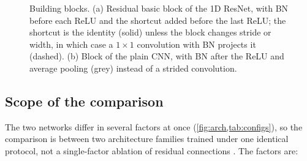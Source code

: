 \documentclass[journal,onecolumn]{IEEEtran}
\begin{document}
\begin{figure}[!t]
  \caption{Building blocks. (a) Residual basic block of the 1D ResNet, with
  BN before each ReLU and the shortcut added before the last ReLU; the
  shortcut is the identity (solid) unless the block changes stride or
  width, in which case a $1{\times}1$ convolution with BN projects it
  (dashed). (b) Block of the plain CNN, with BN after the ReLU and average
  pooling (grey) instead of a strided convolution.}
  \label{fig:blocks}
\end{figure}

\subsection{Scope of the comparison}
\label{sec:models-scope}
The two networks differ in several factors at once
(\cref{fig:arch,tab:configs}), so the comparison is between two architecture
families trained under one identical protocol, not a single-factor ablation
of residual connections \cite{he2016deep}. The factors are:
\end{document}
